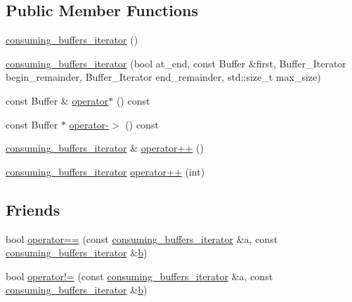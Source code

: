 \subsection*{Public Member Functions}
\begin{DoxyCompactItemize}
\item 
\hyperlink{classasio_1_1detail_1_1consuming__buffers__iterator_a9c8724cf876664ca8d8cc9ffc0946a72}{consuming\+\_\+buffers\+\_\+iterator} ()
\item 
\hyperlink{classasio_1_1detail_1_1consuming__buffers__iterator_a6d9a4fc6dad9af8979f5ca991612985b}{consuming\+\_\+buffers\+\_\+iterator} (bool at\+\_\+end, const Buffer \&first, Buffer\+\_\+\+Iterator begin\+\_\+remainder, Buffer\+\_\+\+Iterator end\+\_\+remainder, std\+::size\+\_\+t max\+\_\+size)
\item 
const Buffer \& \hyperlink{classasio_1_1detail_1_1consuming__buffers__iterator_a2ab29aa14557ac04a71b1f5015a06c0d}{operator$\ast$} () const 
\item 
const Buffer $\ast$ \hyperlink{classasio_1_1detail_1_1consuming__buffers__iterator_a2eaf29938b709e047a7d77ce79113a59}{operator-\/$>$} () const 
\item 
\hyperlink{classasio_1_1detail_1_1consuming__buffers__iterator}{consuming\+\_\+buffers\+\_\+iterator} \& \hyperlink{classasio_1_1detail_1_1consuming__buffers__iterator_a552656665d22c59edf9d4579909ed9aa}{operator++} ()
\item 
\hyperlink{classasio_1_1detail_1_1consuming__buffers__iterator}{consuming\+\_\+buffers\+\_\+iterator} \hyperlink{classasio_1_1detail_1_1consuming__buffers__iterator_ad461a03cac97b7846e73ac26e10290bd}{operator++} (int)
\end{DoxyCompactItemize}
\subsection*{Friends}
\begin{DoxyCompactItemize}
\item 
bool \hyperlink{classasio_1_1detail_1_1consuming__buffers__iterator_ab16002dbe7c4b2813044f299c8372195}{operator==} (const \hyperlink{classasio_1_1detail_1_1consuming__buffers__iterator}{consuming\+\_\+buffers\+\_\+iterator} \&a, const \hyperlink{classasio_1_1detail_1_1consuming__buffers__iterator}{consuming\+\_\+buffers\+\_\+iterator} \&\hyperlink{group__async__read_ga945a5c18fa77a9e2eba420f8f44b2a4f}{b})
\item 
bool \hyperlink{classasio_1_1detail_1_1consuming__buffers__iterator_abd4cff78f2ecab48a7175237131f3bcb}{operator!=} (const \hyperlink{classasio_1_1detail_1_1consuming__buffers__iterator}{consuming\+\_\+buffers\+\_\+iterator} \&a, const \hyperlink{classasio_1_1detail_1_1consuming__buffers__iterator}{consuming\+\_\+buffers\+\_\+iterator} \&\hyperlink{group__async__read_ga945a5c18fa77a9e2eba420f8f44b2a4f}{b})
\end{DoxyCompactItemize}


